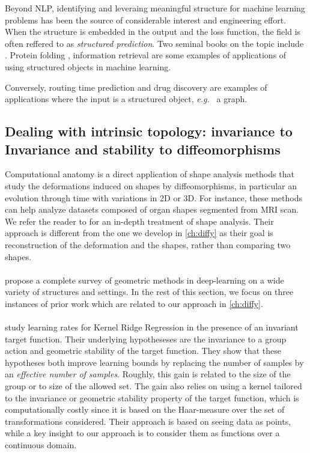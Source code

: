 Beyond NLP, identifying and leveraing meaningful structure for machine learning problems has been the source of considerable interest and engineering effort. When the structure is embedded in the output and the loss function, the field is often reffered to as \emph{structured prediction}. Two seminal books on the topic include \citep{advancedStructuredPrediction2014MIT,bakir2007predicting}. Protein folding  \citep{alphafold}, information retrieval \citep{duchi2010} are some examples of applications of using structured objects in machine learning.

Conversely, routing time prediction \citep{deepmind-traffic} and drug discovery \citep{stokes-antibiotics} are examples of applications where the input is a structured object, \emph{e.g.\ } a graph.

\subsection{Dealing with intrinsic topology: invariance to Invariance and stability to diffeomorphisms}

Computational anatomy is a direct application of shape analysis methods that study the deformations induced on shapes by diffeomorphisms, in particular an evolution through time with variations in 2D or 3D. For instance, these methods can help analyze datasets composed of organ shapes segmented from MRI scan. We refer the reader to \citet{younes} for an in-depth treatment of shape analysis. Their approach is different from the one we develop in \cref{ch:diffy} as their goal is reconstruction of the deformation and the shapes, rather than comparing two shapes.

\paragraph{}
\citet{bronstein} propose a complete survey of geometric methods in deep-learning on a wide variety of structures and settings. In the rest of this section, we focus on three instances of prior work which are related to our approach in \cref{ch:diffy}.

\paragraph{}
\citet{bietti} study learning rates for Kernel Ridge Regression in the presence of an invariant target function. Their underlying hypotheseses are the invariance to a group action and geometric stability of the target function. They show that these hypotheses both improve learning bounds by replacing the number of samples by an \emph{effective number of samples}. Roughly, this gain is related to the size of the group or to size of the allowed set. The gain also relies on using a kernel tailored to the invariance or geometric stability property of the target function, which is computationally costly since it is based on the Haar-measure over the set of transformations considered. Their approach is based on seeing data as points, while a key insight to our approach is to consider them as functions over a continuous domain.

